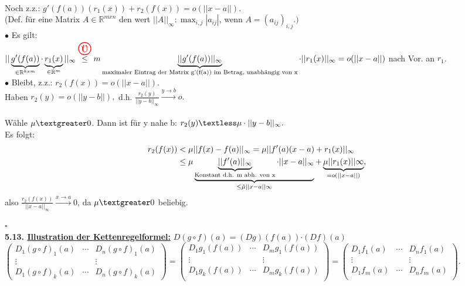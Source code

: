 \documentclass[]{scrartcl}
\newcommand{\redcircle}[1]{%
	\tikz[baseline=(char.base)]{
		\node[shape=circle, draw=red, text=red, thick, inner sep=1pt] (char) 
		{\textbf{#1}};
	}%
}
\begin{document}
	\\
	Noch z.z.: $g'(f(a))(r_1(x))+r_2(f(x))=o(||x-a||).$\\
	(Def. für eine Matrix $A\in \mathbb{R}^{m x n}$ den wert 
	$||A||_\infty:\max_{i,j}|a_{ij}|$, wenn $A=(a_{ij})_{i,j}.)$\\
	$\bullet$ Es gilt:\\
	$||\underbrace{g'(f(a))}_{\in\mathbb{R}^{k x m}}\cdot 
	\underbrace{r_1(x)}_{\in \mathbb{R}^m}||_\infty 
	\overset{\redcircle{Ü}}{\leq}
	m\underbrace{||g'(f(a))||_\infty}_{\text{maximaler Eintrag der Matrix 
	g'(f(a)) im Betrag, unabhängig von x}}\cdot ||r_1(x)||_\infty=o(||x-a||)$ 
	nach Vor. an $r_1$.\\
	$\bullet$ Bleibt, z.z.: $r_2(f(x))=o(||x-a||).$\\
	Haben $r_2(y)=o(||y-b||),$ d.h. 
	$\frac{r_2(y)}{||y-b||_\infty}\xrightarrow{y\rightarrow b}o.$\\
	\\
	Wähle $\mu \textgreater 0$. Dann ist für y nahe b: $r_2(y)\textless 
	\mu\cdot||y-b||_\infty.$\\
	Es folgt: \begin{align}
		r_2(f(x))&\textless 
		\mu||f(x)-f(a)||_\infty=\mu||f'(a)(x-a)+r_1(x)||_\infty\\
		&\leq\mu \underbrace{\underbrace{||f'(a)||_\infty}_{\text{Konstant d.h. 
		m abh. von x}}\cdot||x-a||_\infty}_{\leq 
		\tilde{\mu}||x-a||\infty}+\underbrace{\mu||r_1(x)||\infty}_{=o(||x-a||)},
	\end{align}
	also $\frac{r_2 (f(x))}{||x-a||_\infty}\xrightarrow{x\rightarrow a}0$, da 
	$\mu \textgreater 0$ beliebig.\\
	\strut\hfill$\square$\\
	\textbf{5.13. \underline{Illustration der Kettenregelformel:}} $D(g\circ 
	f)(a)=$\ul{$(Dg)(f(a))$}$\cdot$\ul{$(Df)(a)$}\\
	$\begin{pmatrix}
		D_1(g\circ f)_1(a)&\cdots&D_n(g\circ f)_1(a)\\
		\vdots& &\vdots\\
		D_1(g\circ f)_k(a)&\cdots&D_n(g\circ f)_k(a)
	\end{pmatrix}=\begin{pmatrix}
	D_1g_1(f(a))&\cdots&D_mg_1(f(a))\\
	\vdots& &\vdots\\
	D_1g_k(f(a))&\cdots&D_mg_k(f(a))\\
	\end{pmatrix}=\begin{pmatrix}
		D_1f_1(a)&\cdots&D_nf_1(a)\\
		\vdots& &\vdots\\
		D_1f_m(a)&\cdots&D_nf_m(a)\\
	\end{pmatrix}.$\\
\end{document}

